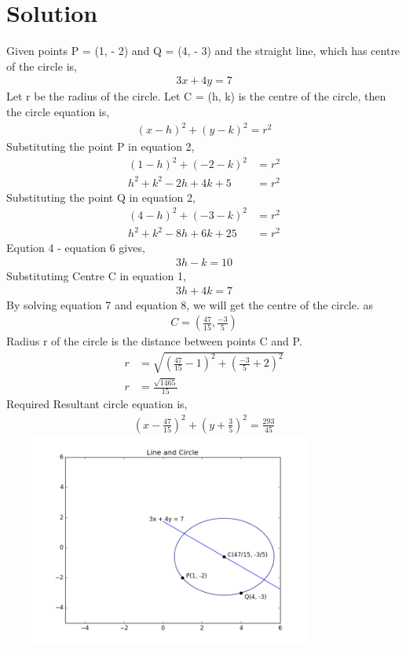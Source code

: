 \documentclass[journal,12pt,twocolumn]{IEEEtran}
\begin{document}
\section{Solution}
Given points P = (1, - 2) and Q = (4, - 3) and the straight line, which has centre of the circle is,
\begin{align} 
3x + 4y = 7
\end {align}
Let r be the radius of the circle.
Let C = (h, k) is the centre of the circle, then the circle equation is,
\begin{align} 
(x-h)^2 + (y-k)^2 = r^2
\end {align}
Substituting the point P in equation 2,
\begin{align} 
(1-h)^2 + (-2-k)^2 &= r^2 \\
h^2 + k^2 -2h + 4k +5 &= r^2
\end {align}
Substituting the point Q in equation 2,
\begin{align} 
(4-h)^2 + (-3-k)^2 &= r^2 \\
h^2 + k^2 -8h + 6k + 25 &= r^2
\end {align}
Eqution 4 - equation 6 gives,
\begin{align} 
3h - k = 10
\end {align}
Substitutimg Centre C in equation 1,
\begin{align} 
3h + 4k = 7
\end {align}
By solving equation 7 and equation 8, we will get the centre of the circle.
 as 
\begin{align} 
C = (\frac{47}{15}, \frac{-3}{5})
\end {align}
Radius r of the circle is the distance between points C and P.
\begin{align} 
r &= \sqrt{(\frac{47}{15} - 1)^2 + (\frac{-3}{5} + 2)^2} \\
r &= \frac{\sqrt{1465}}{15}
\end {align}
Required Resultant circle equation is,
\begin{align} 
(x-\frac{47}{15})^2 + (y+\frac{3}{5})^2 = \frac{293}{45}
\end {align}
\includegraphics[width=11cm, height=7cm]{circle}
\end{document}
